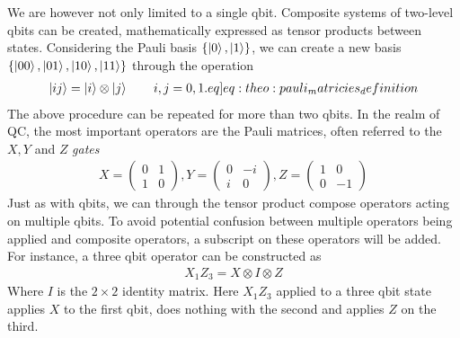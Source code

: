 We are however not only limited to a single qbit. Composite systems of two-level qbits can be created, mathematically expressed as tensor products between states. Considering the Pauli basis $\{\ket{0},\ket{1}\}$, we can create a new basis $\{\ket{00},\ket{01},\ket{10},\ket{11}\}$ through the operation
\begin{align}
    \ket{ij} = \ket{i} \otimes \ket{j} \hspace{20px} i,j=0,1. \label[eq]{eq:theo:pauli_matricies_definition}
\end{align}
The above procedure can be repeated for more than two qbits. In the realm of QC, the most important operators are the Pauli matrices, often referred to the $X,Y$ and $Z$ \textit{gates} 
\begin{align}
    X = \begin{pmatrix}
        0 & 1 \\
        1 & 0
    \end{pmatrix}, Y = \begin{pmatrix}
        0 & -i \\
        i & 0
    \end{pmatrix}, Z = \begin{pmatrix}
        1 & 0 \\
        0 & -1
    \end{pmatrix}
\end{align}
Just as with qbits, we can through the tensor product compose operators acting on multiple qbits. To avoid potential confusion between multiple operators being applied and composite operators, a subscript on these operators will be added. For instance, a three qbit operator can be constructed as
\begin{align}
    X_1 Z_3 = X \otimes I \otimes Z 
\end{align} 
Where $I$ is the $2 \times 2$ identity matrix. Here $X_1 Z_3$ applied to a three qbit state applies $X$ to the first qbit, does nothing with the second and applies $Z$ on the third.

